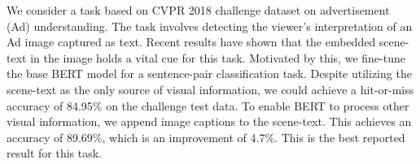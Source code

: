 We consider a task based on CVPR 2018 challenge dataset on advertisement (Ad) understanding. The task involves detecting the viewer's interpretation of an Ad image captured as text. Recent results have shown that the embedded scene-text in the image holds a vital cue for this task. Motivated by this, we fine-tune the base BERT model for a sentence-pair classification task. Despite utilizing the scene-text as the only source of visual information, we could achieve a hit-or-miss accuracy of 84.95\% on the challenge test data. To enable BERT to process other visual information, we append image captions to the scene-text. This achieves an accuracy of 89.69\%, which is an improvement of 4.7\%. This is the best reported result for this task.
